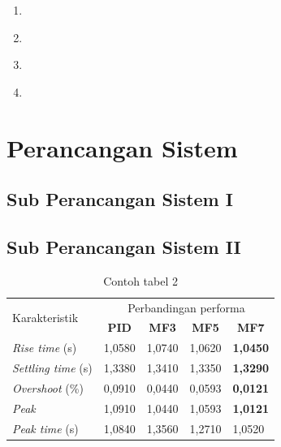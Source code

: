 \begin{enumerate}
    \item \lipsum[2][5] \\ \lipsum[3]
    \item \lipsum[2][5] \\ \lipsum[3]
    \item \lipsum[2][5] \\ \lipsum[3]
    \item \lipsum[2][5] \\ \lipsum[3]
\end{enumerate}

\section{Perancangan Sistem}
\subsection{Sub Perancangan Sistem I}
\lipsum[2]

\subsection{Sub Perancangan Sistem II}
\lipsum[2]

\begin{table}[H]
    \centering
    \caption{Contoh tabel 2}
    \label{t perbandinganRespon}
    \begin{tabular}{lllll}
        \hline
        \multirow{2}{*}{Karakteristik} & \multicolumn{4}{c}{Perbandingan performa} \\ \cline{2-5} 
        & \multicolumn{1}{c}{\textbf{PID}} & \multicolumn{1}{c}{\textbf{MF3}} & \multicolumn{1}{c}{\textbf{MF5}} & \multicolumn{1}{c}{\textbf{MF7}} \\ \hline
        \textit{Rise time} (s)  & 1,0580  & 1,0740  & 1,0620    & \textbf{1,0450} \\
        \textit{Settling time} (s) & 1,3380 & 1,3410  & 1,3350  & \textbf{1,3290} \\
        \textit{Overshoot} (\%) & 0,0910 & 0,0440  & 0,0593     & \textbf{0,0121} \\
        \textit{Peak} & 1,0910 & 1,0440 & 1,0593 & \textbf{1,0121} \\
        \textit{Peak time} (s) & 1,0840 & 1,3560  & 1,2710      & 1,0520  \\ \hline
    \end{tabular}
\end{table}


